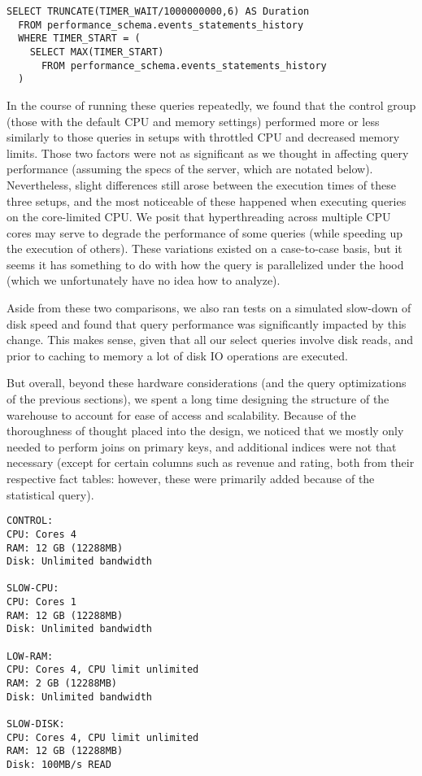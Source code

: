 \begin{lstlisting}
SELECT TRUNCATE(TIMER_WAIT/1000000000,6) AS Duration 
  FROM performance_schema.events_statements_history 
  WHERE TIMER_START = (
    SELECT MAX(TIMER_START) 
      FROM performance_schema.events_statements_history
  )
\end{lstlisting}

In the course of running these queries repeatedly, we found that the control group (those with the default CPU and memory settings) performed more or less similarly to those queries in setups with throttled CPU and decreased memory limits. Those two factors were not as significant as we thought in affecting query performance (assuming the specs of the server, which are notated below). Nevertheless, slight differences still arose between the execution times of these three setups, and the most noticeable of these happened when executing queries on the core-limited CPU. We posit that hyperthreading across multiple CPU cores may serve to degrade the performance of some queries (while speeding up the execution of others). These variations existed on a case-to-case basis, but it seems it has something to do with how the query is parallelized under the hood (which we unfortunately have no idea how to analyze).

Aside from these two comparisons, we also ran tests on a simulated slow-down of disk speed and found that query performance was significantly impacted by this change. This makes sense, given that all our select queries involve disk reads, and prior to caching to memory a lot of disk IO operations are executed.

But overall, beyond these hardware considerations (and the query optimizations of the previous sections), we spent a long time designing the structure of the warehouse to account for ease of access and scalability. Because of the thoroughness of thought placed into the design, we noticed that we mostly only needed to perform joins on primary keys, and additional indices were not that necessary (except for certain columns such as revenue and rating, both from their respective fact tables: however, these were primarily added because of the statistical query).

\begin{verbatim}
CONTROL:
CPU: Cores 4
RAM: 12 GB (12288MB)
Disk: Unlimited bandwidth

SLOW-CPU:
CPU: Cores 1
RAM: 12 GB (12288MB)
Disk: Unlimited bandwidth

LOW-RAM:
CPU: Cores 4, CPU limit unlimited
RAM: 2 GB (12288MB)
Disk: Unlimited bandwidth

SLOW-DISK:
CPU: Cores 4, CPU limit unlimited
RAM: 12 GB (12288MB)
Disk: 100MB/s READ
\end{verbatim}